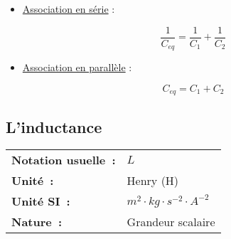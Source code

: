 \begin{itemize}
\item \underline{Association en série} : \\

\begin{center}
\begin{minipage}{.2\textwidth}
\begin{center}

\end{center}
\end{minipage}
\hspace{1cm}
\begin{minipage}{.3\textwidth} 
\begin{equation}
	\dfrac{1}{C_{eq}} = \dfrac{1}{C_1} + \dfrac{1}{C_2}
\end{equation}
\end{minipage}
\end{center}

\vspace{0.5cm}

\item \underline{Association en parallèle} : \\

\begin{center}
\begin{minipage}{.2\textwidth}
\begin{center}
	
\end{center}
\end{minipage}
\hspace{1cm}
\begin{minipage}{.3\textwidth} 
\begin{equation}
	C_{eq} = C_1 + C_2
\end{equation}
\end{minipage}
\end{center}
\end{itemize}


\subsection{L'inductance }

\vspace{0.5cm}
\begin{tabular}{ll}
\textbf{Notation usuelle~:} & $L$ \\
\textbf{Unité~:} & Henry (H) \\
	\textbf{Unité SI~:} & $m^2 \cdot kg \cdot {s}^{-2} \cdot A^{-2}$ \\
\textbf{Nature~:} & Grandeur scalaire \\
\end{tabular} 

